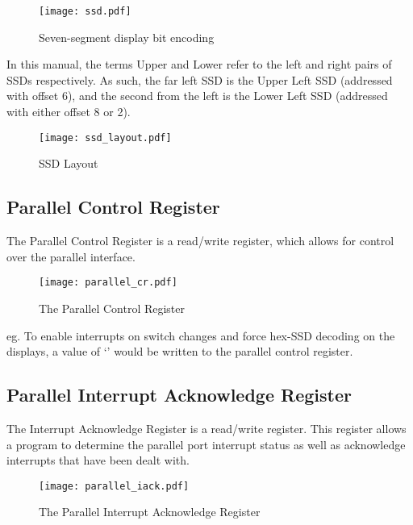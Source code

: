 \begin{figure}[h]
\begin{center}
\texttt{[image: ssd.pdf]}
\caption{Seven-segment display bit encoding}
\label{fig:ssd}
\end{center}
\end{figure}

In this manual, the terms Upper and Lower refer to the left and right
pairs of SSDs respectively. As such, the far left SSD is the Upper Left
SSD (addressed with offset 6), and the second from the left is the Lower
Left SSD (addressed with either offset 8 or 2).

\begin{figure}[h]
\begin{center}
\texttt{[image: ssd\_layout.pdf]}
\caption{SSD Layout}
\label{ssd_layout_pic}
\end{center}
\end{figure}

\subsection{Parallel Control Register}

The Parallel Control Register is a read/write register, which allows
for control over the parallel interface.

\begin{figure}[h]
\begin{center}
\texttt{[image: parallel\_cr.pdf]}
\caption{The Parallel Control Register}
\label{parallel_cr_pic}
\end{center}
\end{figure}

eg. To enable interrupts on switch changes and force hex-SSD decoding
on the displays, a value of `' would be written to
the parallel control register.

\subsection{Parallel Interrupt Acknowledge Register}

The Interrupt Acknowledge Register is a read/write register. This
register allows a program to determine the parallel port interrupt
status as well as acknowledge interrupts that have been dealt with.

\begin{figure}[h]
\begin{center}
\texttt{[image: parallel\_iack.pdf]}
\caption{The Parallel Interrupt Acknowledge Register}
\label{parallel_iack_pic}
\end{center}
\end{figure}

